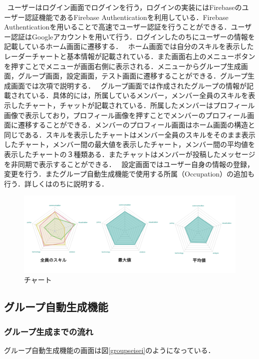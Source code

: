 \documentclass{funthesis}
\begin{document}
\ ユーザーはログイン画面でログインを行う，ログインの実装にはFirebaseのユーザー認証機能であるFirebase Authenticationを利用している．Firebase Authenticationを用いることで高速でユーザー認証を行うことができる．ユーザー認証はGoogleアカウントを用いて行う．ログインしたのちにユーザーの情報を記載しているホーム画面に遷移する．
\ ホーム画面では自分のスキルを表示したレーダーチャートと基本情報が記載されている．また画面右上のメニューボタンを押すことでメニューが画面右側に表示される．メニューからグループ生成画面，グループ画面，設定画面，テスト画面に遷移することができる．グループ生成画面では次項で説明する．
\ グループ画面では作成されたグループの情報が記載されている．具体的には，所属しているメンバー，メンバー全員のスキルを表示したチャート，チャットが記載されている．所属したメンバーはプロフィール画像で表示しており，プロフィール画像を押すことでメンバーのプロフィール画面に遷移することができる．メンバーのプロフィール画面はホーム画面の構造と同じである．スキルを表示したチャートはメンバー全員のスキルをそのまま表示したチャート，メンバー間の最大値を表示したチャート，メンバー間の平均値を表示したチャートの３種類ある．またチャットはメンバーが投稿したメッセージを非同期で表示することができる．
\ 設定画面ではユーザー自身の情報の登録，変更を行う．またグループ自動生成機能で使用する所属（Occupation）の追加も行う．詳しくはのちに説明する．



\begin{figure}[H]
 \centering
   \includegraphics[width=150mm]{figures/chart.png}
 \caption{チャート}
 \label{chart}
\end{figure}


\subsection{グループ自動生成機能}
\subsubsection{グループ生成までの流れ}
グループ自動生成機能の画面は図\ref{groupseisei}のようになっている．
\end{document}
